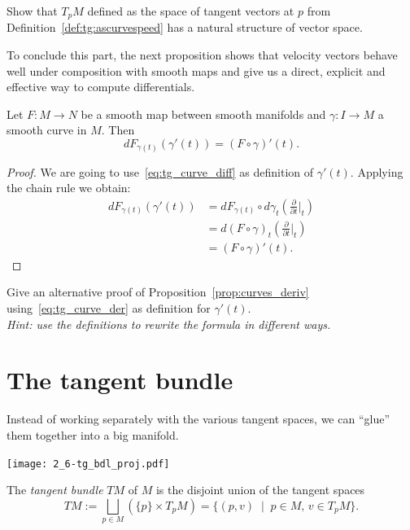 \begin{exercise}
	Show that $T_p M$ defined as the space of tangent vectors at $p$ from Definition~\ref{def:tg:ascurvespeed} has a natural structure of vector space.
\end{exercise}

To conclude this part, the next proposition shows that velocity vectors behave well under composition with smooth maps and give us a direct, explicit and effective way to compute differentials.

\begin{proposition}\label{prop:curves_deriv}
	Let $F:M\to N$ be a smooth map between smooth manifolds and $\gamma:I\to M$ a smooth curve in $M$.
	Then
	\begin{equation}
		d F_{\gamma(t)} (\gamma'(t)) = (F\circ\gamma)'(t).
	\end{equation}
\end{proposition}
\begin{proof}
	We are going to use~\eqref{eq:tg_curve_diff} as definition of $\gamma'(t)$.
	Applying the chain rule we obtain:
	\begin{align}
		d F_{\gamma(t)} (\gamma'(t))
		 & = d F_{\gamma(t)} \circ d\gamma_t\left(\frac{\partial}{\partial t}\Big|_t\right) \\
		 & = d (F\circ\gamma)_t \left(\frac{\partial}{\partial t}\Big|_t\right)             \\
		 & = (F\circ\gamma)'(t).
	\end{align}
\end{proof}

\begin{exercise}
	Give an alternative proof of Proposition~\ref{prop:curves_deriv} using~\eqref{eq:tg_curve_der} as definition for $\gamma'(t)$.\\
	\textit{\small Hint: use the definitions to rewrite the formula in different ways.}
\end{exercise}

\section{The tangent bundle}\label{sec:tangentbundle}

Instead of working separately with the various tangent spaces, we can ``glue'' them together into a big manifold.

\begin{marginfigure}
	\texttt{[image: 2\_6-tg\_bdl\_proj.pdf]}
\end{marginfigure}
\begin{definition}
	The \emph{tangent bundle} $TM$ of $M$ is the disjoint union of the tangent spaces
	\begin{equation}
		TM := \bigsqcup_{p\in M}\left(\{p\}\times T_pM\right)
		= \{(p,v) \;\mid\; p\in M,\, v\in T_pM\}.
	\end{equation}
\end{definition}

